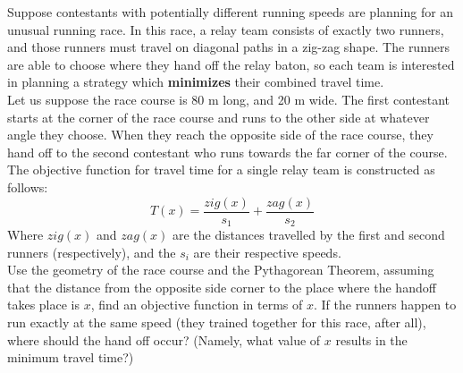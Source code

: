 \documentclass{ximera}
\begin{document}
\begin{exercise}
Suppose contestants with potentially different running speeds are planning for an unusual running race.  In this race, a relay team consists of exactly two runners, and those runners must travel on diagonal paths in a zig-zag shape.  The runners are able to choose where they hand off the relay baton, so each team is interested in planning a strategy which \textbf{minimizes} their combined travel time. \\
Let us suppose the race course is 80 m long, and 20 m wide. The first contestant starts at the corner of the race course and runs to the other side at whatever angle they choose.  When they reach the opposite side of the race course, they hand off to the second contestant who runs towards the far corner of the course.\\
The objective function for travel time for a single relay team is constructed as follows: $$T(x)=\frac{zig(x)}{s_1}+\frac{zag(x)}{s_2}$$
Where $zig(x)$ and $zag(x)$ are the distances travelled by the first and second runners (respectively), and the $s_i$ are their respective speeds.\\
Use the geometry of the race course and the Pythagorean Theorem, assuming that the distance from the opposite side corner to the place where the handoff takes place is $x$, find an objective function in terms of $x$.  If the runners happen to run exactly at the same speed (they trained together for this race, after all), where should the hand off occur? (Namely, what value of $x$ results in the minimum travel time?)


\end{exercise}
\end{document}
